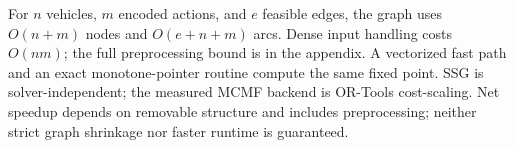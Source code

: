 For $n$ vehicles, $m$ encoded actions, and $e$ feasible edges, the graph
uses $O(n+m)$ nodes and $O(e+n+m)$ arcs. Dense input handling costs
$O(nm)$; the full preprocessing bound is in the appendix.
A vectorized fast path and an exact monotone-pointer routine compute
the same fixed point. SSG is solver-independent; the measured MCMF
backend is OR-Tools cost-scaling.
Net speedup depends on removable structure and includes preprocessing;
neither strict graph shrinkage nor faster runtime is guaranteed.
